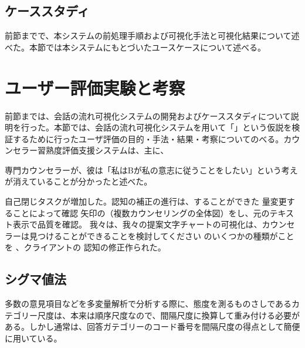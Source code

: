 \documentclass[shuuron]{kuee}
\begin{document}







\subsection{ケーススタディ}

前節までで、本システムの前処理手順および可視化手法と可視化結果について述べた。本節では本システムにもとづいたユースケースについて述べる。

\section{ユーザー評価実験と考察}

前節までは、会話の流れ可視化システムの開発およびケーススタディについて説明を行った。本節では、会話の流れ可視化システムを用いて「」という仮説を検証するために行ったユーザ評価の目的・手法・結果・考察についてのべる。カウンセラー習熟度評価支援システムは、主に、





  専門カウンセラーが、彼は「私はBが私の意志に従うことをしたい」という考えが消えていることが分かったと述べた。

自己閉じタスクが増加した。認知の補正の進行は、することができた 量変更することによって確認 矢印の（複数カウンセリングの全体図）をし、元のテキスト表示で品質を確認。 我々は、我々の提案文字チャートの可視化は、カウンセラーは見つけることができることを検討してください のいくつかの種類がことを 、クライアントの 認知の修正作られた。

\subsection{シグマ値法}
多数の意見項目などを多変量解析で分析する際に、態度を測るものさしであるカテゴリー尺度は、本来は順序尺度なので、間隔尺度に換算して重み付ける必要がある。しかし通常は、回答ガテゴリーのコード番号を間隔尺度の得点として簡便に用いている。
\end{document}
